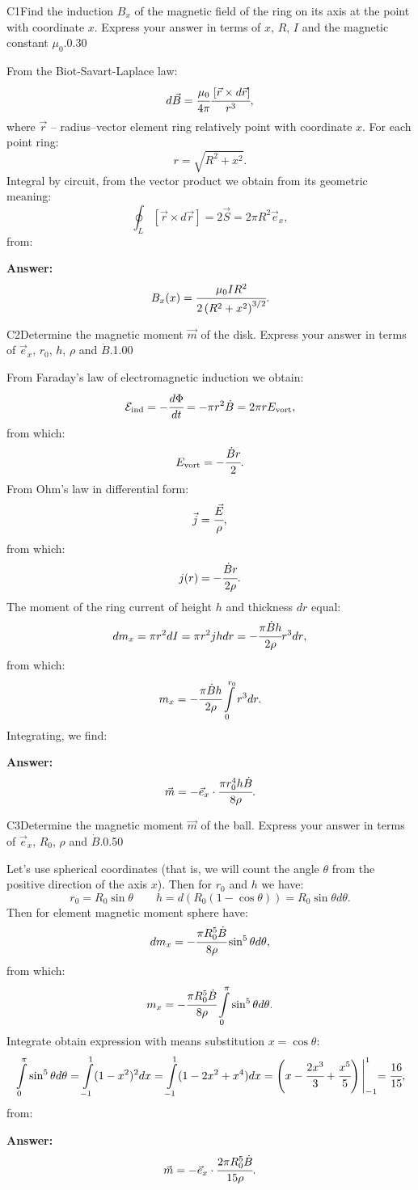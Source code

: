 \documentclass[11pt,a4paper]{article}
\begin{document}
\begin{solcard}{C1}{Find the induction $B_x$ of the magnetic field of the ring on its axis at the point with coordinate $x$. Express your answer in terms of $x$, $R$, $I$ and the magnetic constant $\mu_0$.}{0.30}

From the Biot-Savart-Laplace law: $$d\vec{B}=\cfrac{\mu_0}{4\pi}\cfrac{\left[\vec{r}\times d\vec{r}\right]}{r^3}{,} $$where $\vec{r}$ – radius–vector element ring relatively point with coordinate $x$. For each point ring: $$r=\sqrt{R^2+x^2}{.} $$Integral by circuit, from the vector product we obtain from its geometric meaning: $$\oint_L\left[\vec{r}\times d\vec{r}\right]=2\vec{S}=2\pi{R}^2\vec{e}_x{,} $$from:

\par\smallskip\noindent\textbf{Answer:} $$B_x(x)=\cfrac{\mu_0IR^2}{2\left(R^2+x^2\right)^{3/2}}{.} $$
\end{solcard}

\begin{solcard}{C2}{Determine the magnetic moment $\vec{m}$ of the disk. Express your answer in terms of $\vec{e}_x$, $r_0$, $h$, $\rho$ and $\dot{B}$.}{1.00}

From Faraday's law of electromagnetic induction we obtain: $$\mathcal{E}_\text{ind}=-\cfrac{d\Phi}{dt}=-\pi{r}^2\dot{B}=2\pi rE_\text{vort}{,} $$from which: $$E_\text{vort}=-\cfrac{\dot{B}r}{2}{.} $$From Ohm's law in differential form: $$\vec{j}=\cfrac{\vec{E}}{\rho}{,} $$from which: $$j(r)=-\cfrac{\dot{B}r}{2\rho}{.} $$The moment of the ring current of height $h$ and thickness $dr$ equal: $$dm_x=\pi{r}^2dI=\pi{r}^2jhdr=-\cfrac{\pi\dot{B}h}{2\rho}r^3dr{,} $$from which: $$m_x=-\cfrac{\pi\dot{B}h}{2\rho}\int\limits_0^{r_0}r^3dr{.} $$Integrating, we find:

\par\smallskip\noindent\textbf{Answer:} $$\vec{m}=-\vec{e}_x\cdot{\cfrac{\pi{r}^4_0h\dot{B}}{8\rho}}{.} $$
\end{solcard}

\begin{solcard}{C3}{Determine the magnetic moment $\vec{m}$ of the ball. Express your answer in terms of $\vec{e}_x$, $R_0$, $\rho$ and $\dot{B}$.}{0.50}

Let's use spherical coordinates (that is, we will count the angle $\theta$ from the positive direction of the axis $x$). Then for $r_0$ and $h$ we have: $$r_0=R_0\sin\theta\qquad h=d(R_0(1-\cos\theta))=R_0\sin\theta d\theta{.} $$Then for element magnetic moment sphere have: $$dm_x=-\cfrac{\pi{R}^5_0\dot{B}}{8\rho}\sin^5\theta d\theta{,} $$from which: $$m_x=-\cfrac{\pi{R}^5_0\dot{B}}{8\rho}\int\limits_{0}^{\pi}\sin^5\theta d\theta{.} $$Integrate obtain expression with means substitution $x=\cos\theta$: $$\int\limits_{0}^{\pi}\sin^5\theta d\theta=\int\limits_{-1}^{1}(1-x^2)^2dx=\int\limits_{-1}^{1}(1-2x^2+x^4)dx=\left(x-\cfrac{2x^3}{3}+\cfrac{x^5}{5}\right)\Biggl|_{-1}^{1}=\cfrac{16}{15}{,} $$from:

\par\smallskip\noindent\textbf{Answer:} $$\vec{m}=-\vec{e}_x\cdot\cfrac{2\pi{R}^5_0\dot{B}}{15\rho}{.} $$
\end{solcard}
\end{document}
